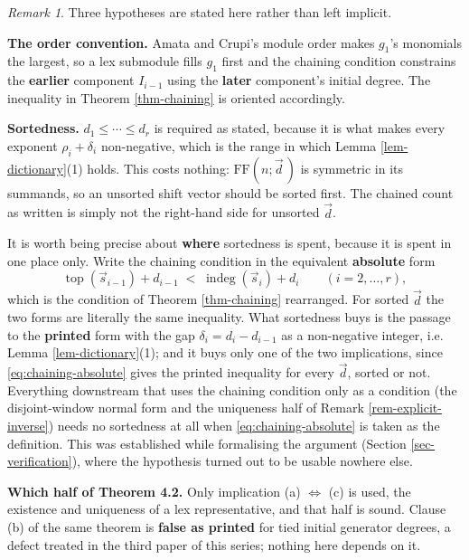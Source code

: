 \documentclass[11pt, a4paper, abstract=yes]{scrartcl}
\theoremstyle{definition}
\theoremstyle{remark}
\newtheorem{remark}[definition]{Remark}
\theoremstyle{plain}
\newcommand{\indeg}{\operatorname{indeg}}
\newcommand{\tp}{\operatorname{top}}
\begin{document}
\begin{remark}
Three hypotheses are stated here rather than left implicit.

\textbf{The order convention.} Amata and Crupi's module order makes \(g_1\)'s monomials the largest, so a
lex submodule fills \(g_1\) first and the chaining condition constrains the \textbf{earlier} component
\(I_{i-1}\) using the \textbf{later} component's initial degree. The inequality in Theorem \ref{thm-chaining}
is oriented accordingly.

\textbf{Sortedness.} \(d_1\le\cdots\le d_r\) is required as stated, because it is what makes every exponent
\(\rho_i+\delta_i\) non-negative, which is the range in which Lemma \ref{lem-dictionary}(1) holds. This
costs nothing: \(\mathrm{FF}(n;\vec d\,)\) is symmetric in its summands, so an unsorted shift vector should be
sorted first. The chained count as written is simply not the right-hand side for unsorted \(\vec d\).

It is worth being precise about \textbf{where} sortedness is spent, because it is spent in one place only.
Write the chaining condition in the equivalent \textbf{absolute} form
\begin{equation}\label{eq:chaining-absolute}
  \tp(\vec s_{i-1})+d_{i-1}\;<\;\indeg(\vec s_i)+d_i \qquad(i=2,\dots,r),
\end{equation}
which is the condition of Theorem \ref{thm-chaining} rearranged. For sorted \(\vec d\) the two forms are literally
the same inequality. What sortedness buys is the passage to the \textbf{printed} form with the gap
\(\delta_i=d_i-d_{i-1}\) as a non-negative integer, i.e. Lemma \ref{lem-dictionary}(1); and it buys only
one of the two implications, since \eqref{eq:chaining-absolute} gives the printed inequality for every
\(\vec d\), sorted or not. Everything downstream that uses the chaining condition only as a condition
(the disjoint-window normal form and the uniqueness half of Remark
\ref{rem-explicit-inverse}) needs no sortedness at all when \eqref{eq:chaining-absolute} is taken as
the definition. This was established while formalising the argument (Section
\ref{sec-verification}), where the hypothesis turned out to be usable nowhere else.

\textbf{Which half of Theorem 4.2.} Only implication (a) \(\Leftrightarrow\) (c) is used, the existence
and uniqueness of a lex representative, and that half is sound. Clause (b) of the same theorem is
\textbf{false as printed} for tied initial generator degrees, a defect treated in the third paper of this
series; nothing here depends on it.
\label{rem-sorted}
\end{remark}
\end{document}
